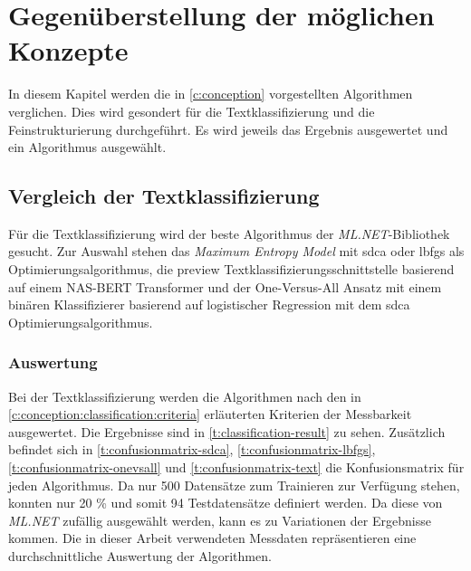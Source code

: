 \chapter{Gegenüberstellung der möglichen Konzepte}
\label{c:comparison}
In diesem Kapitel werden die in \autoref{c:conception} vorgestellten Algorithmen verglichen.
Dies wird gesondert für die Textklassifizierung und die Feinstrukturierung durchgeführt. Es wird jeweils das Ergebnis ausgewertet und ein Algorithmus ausgewählt.

\section{Vergleich der Textklassifizierung}
\label{c:comparison:classification}
Für die Textklassifizierung wird der beste Algorithmus der \textit{ML.NET}-Bibliothek gesucht. Zur Auswahl stehen das \textit{Maximum Entropy Model} mit \ac{sdca} oder \ac{lbfgs} als Optimierungsalgorithmus, die preview Textklassifizierungsschnittstelle basierend auf einem NAS-BERT Transformer und der One-Versus-All Ansatz mit einem binären Klassifizierer basierend auf logistischer Regression mit dem \ac{sdca} Optimierungsalgorithmus.

\subsection{Auswertung}
\label{c:comparison:classification:evaluation}
Bei der Textklassifizierung werden die Algorithmen nach den in \autoref{c:conception:classification:criteria} erläuterten Kriterien der Messbarkeit ausgewertet. Die Ergebnisse sind in \autoref{t:classification-result} zu sehen. Zusätzlich befindet sich in \autoref{t:confusionmatrix-sdca}, \ref{t:confusionmatrix-lbfgs}, \ref{t:confusionmatrix-onevsall} und \ref{t:confusionmatrix-text} die Konfusionsmatrix für jeden Algorithmus. Da nur 500 Datensätze zum Trainieren zur Verfügung stehen, konnten nur 20 \% und somit 94 Testdatensätze definiert werden. Da diese von \textit{ML.NET} zufällig ausgewählt werden, kann es zu Variationen der Ergebnisse kommen. Die in dieser Arbeit verwendeten Messdaten repräsentieren eine durchschnittliche Auswertung der Algorithmen. 



